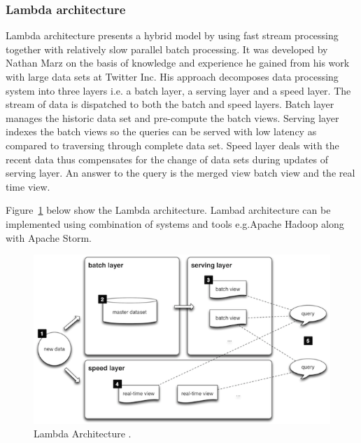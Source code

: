 \subsubsection{ Lambda architecture}
Lambda architecture presents a hybrid model by using fast stream processing together with relatively slow parallel batch processing.  It was developed by Nathan Marz on the basis of knowledge and experience he gained from his work with large data sets at Twitter Inc. His approach decomposes data processing system into three layers i.e. a batch layer, a serving layer and a speed layer. The stream of data is dispatched to both the batch and speed layers. Batch layer manages the historic data set and pre-compute the batch views. Serving layer indexes the batch views so the queries can be served with low latency as compared to traversing through complete data set. Speed layer deals with the recent data thus compensates for the change of data sets during updates of serving layer. An answer to the query is the merged view batch view and the real time view.\cite{marz2013big}\cite{lambdaarch} 

Figure~\ref{fig:lambda} below show the Lambda architecture. Lambad architecture can be implemented using combination of systems and tools e.g.Apache Hadoop along with Apache Storm.
\begin{figure}[ht]
  \begin{center}
    \includegraphics[width=\textwidth]{images/lambda.png}
    \caption{Lambda Architecture \cite{lambdaarch}.}
    \label{fig:lambda}
  \end{center}
\end{figure}

